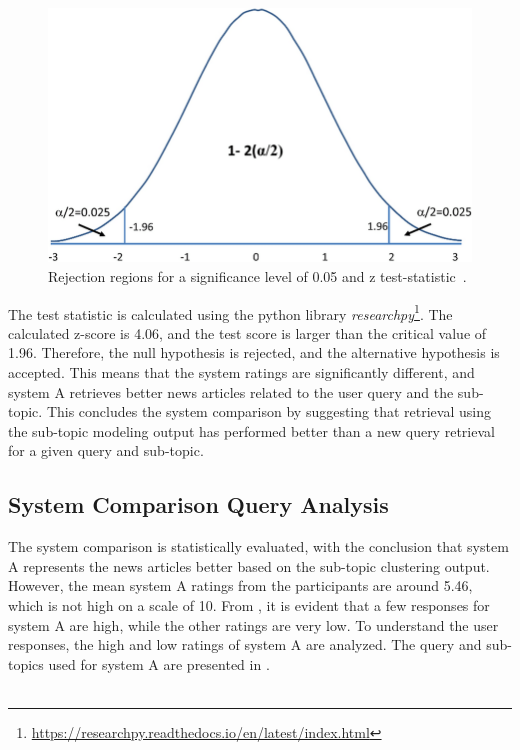 \begin{figure}[h]
	\centering
	\includegraphics[width=.75\textwidth]{images/outside/z_score.PNG}
	\caption[Rejection regions for z test-statistic.]{Rejection regions for a significance level of 0.05 and z test-statistic~\cite{article}. \label{fig:z_score}}
\end{figure}



The test statistic is calculated using the python library \emph{researchpy}\footnote{\url{https://researchpy.readthedocs.io/en/latest/index.html}}. The calculated z-score is 4.06, and the test score is larger than the critical value of 1.96. Therefore, the null hypothesis is rejected, and the alternative hypothesis is accepted. This means that the system ratings are significantly different, and system A retrieves better news articles related to the user query and the sub-topic. This concludes the system comparison by suggesting that retrieval using the sub-topic modeling output has performed better than a new query retrieval for a given query and sub-topic.

\subsection{System Comparison Query Analysis}

The system comparison is statistically evaluated, with the conclusion that system A represents the news articles better based on the sub-topic clustering output. However, the mean system A ratings from the participants are around 5.46, which is not high on a scale of 10. From , it is evident that a few responses for system A are high, while the other ratings are very low. To understand the user responses, the high and low ratings of system A are analyzed. The query and sub-topics used for system A are presented in .\\
\\

